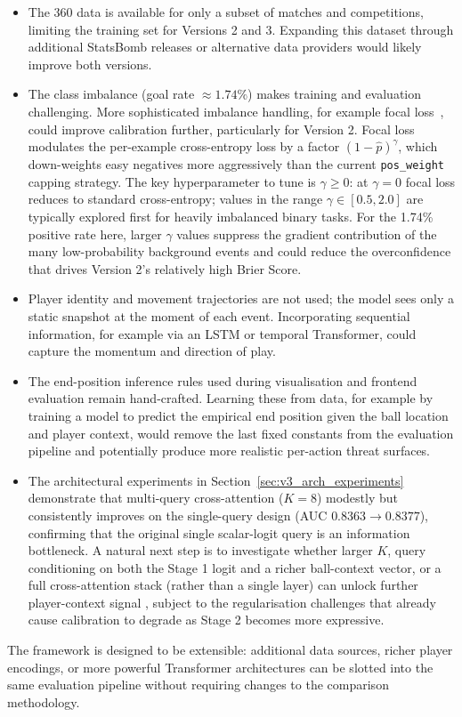\begin{itemize}
    \item The 360 data is available for only a subset of matches and competitions, limiting the training set for Versions 2 and 3. Expanding this dataset through additional StatsBomb releases or alternative data providers would likely improve both versions.

    \item The class imbalance (goal rate $\approx 1.74\%$) makes training and evaluation challenging. More sophisticated imbalance handling, for example focal loss~\cite{lin2017}, could improve calibration further, particularly for Version 2. Focal loss modulates the per-example cross-entropy loss by a factor $(1-\hat{p})^\gamma$, which down-weights easy negatives more aggressively than the current \texttt{pos\_weight} capping strategy. The key hyperparameter to tune is $\gamma \geq 0$: at $\gamma = 0$ focal loss reduces to standard cross-entropy; values in the range $\gamma \in [0.5, 2.0]$ are typically explored first for heavily imbalanced binary tasks. For the 1.74\% positive rate here, larger $\gamma$ values suppress the gradient contribution of the many low-probability background events and could reduce the overconfidence that drives Version 2's relatively high Brier Score.

    \item Player identity and movement trajectories are not used; the model sees only a static snapshot at the moment of each event. Incorporating sequential information, for example via an LSTM or temporal Transformer, could capture the momentum and direction of play.

    \item The end-position inference rules used during visualisation and frontend evaluation remain hand-crafted. Learning these from data, for example by training a model to predict the empirical end position given the ball location and player context, would remove the last fixed constants from the evaluation pipeline and potentially produce more realistic per-action threat surfaces.

    \item The architectural experiments in Section~\ref{sec:v3_arch_experiments} demonstrate that multi-query cross-attention ($K=8$) modestly but consistently improves on the single-query design (AUC $0.8363 \to 0.8377$), confirming that the original single scalar-logit query is an information bottleneck. A natural next step is to investigate whether larger $K$, query conditioning on both the Stage 1 logit and a richer ball-context vector, or a full cross-attention stack (rather than a single layer) can unlock further player-context signal , subject to the regularisation challenges that already cause calibration to degrade as Stage 2 becomes more expressive.
\end{itemize}

The framework is designed to be extensible: additional data sources, richer player encodings, or more powerful Transformer architectures can be slotted into the same evaluation pipeline without requiring changes to the comparison methodology.
